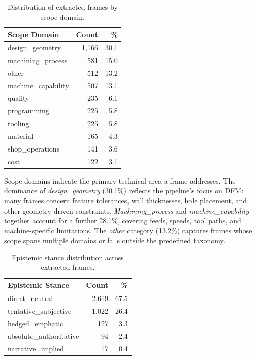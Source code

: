 \begin{table}[t]
\caption{Distribution of extracted frames by scope domain.}
\label{tab:scope-dist}
\centering
\begin{tabular}{lrr}
\toprule
Scope Domain & Count & \% \\
\midrule
design\_geometry     & 1{,}166 & 30.1 \\
machining\_process   & 581     & 15.0 \\
other                & 512     & 13.2 \\
machine\_capability  & 507     & 13.1 \\
quality              & 235     &  6.1 \\
programming          & 225     &  5.8 \\
tooling              & 225     &  5.8 \\
material             & 165     &  4.3 \\
shop\_operations     & 141     &  3.6 \\
cost                 & 122     &  3.1 \\
\bottomrule
\end{tabular}
\end{table}

Scope domains indicate the primary technical area a frame addresses.
The dominance of \emph{design\_geometry} (30.1\%) reflects the
pipeline's focus on DFM: many frames concern feature tolerances,
wall thicknesses, hole placement, and other geometry-driven
constraints.  \emph{Machining\_process} and
\emph{machine\_capability} together account for a further 28.1\%,
covering feeds, speeds, tool paths, and machine-specific limitations.
The \emph{other} category (13.2\%) captures frames whose scope spans
multiple domains or falls outside the predefined taxonomy.


\begin{table}[t]
\caption{Epistemic stance distribution across extracted frames.}
\label{tab:epistemic-dist}
\centering
\begin{tabular}{lrr}
\toprule
Epistemic Stance & Count & \% \\
\midrule
direct\_neutral           & 2{,}619 & 67.5 \\
tentative\_subjective     & 1{,}022 & 26.4 \\
hedged\_emphatic          & 127     &  3.3 \\
absolute\_authoritative   &  94     &  2.4 \\
narrative\_implied        &  17     &  0.4 \\
\bottomrule
\end{tabular}
\end{table}


